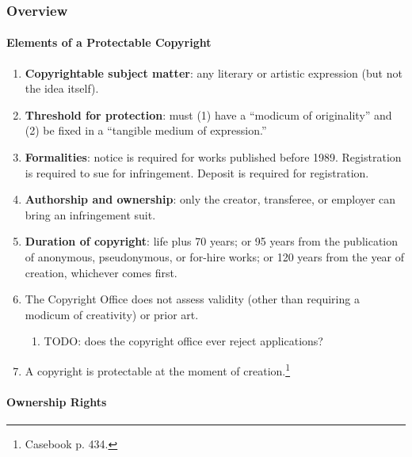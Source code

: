 \subsubsection{Overview}

\paragraph{Elements of a Protectable Copyright}

\begin{enumerate}
    \item \textbf{Copyrightable subject matter}: any literary or artistic 
    expression (but not the idea itself).
    \item \textbf{Threshold for protection}: must (1) have a ``modicum of 
    originality'' and (2) be fixed in a ``tangible medium of expression.''
    \item \textbf{Formalities}: notice is required for works published before 
    1989. Registration is required to sue for infringement. Deposit is 
    required for registration.
    \item \textbf{Authorship and ownership}: only the creator, transferee, or 
    employer can bring an infringement suit.
    \item \textbf{Duration of copyright}: life plus 70 years; or 95 years from 
    the publication of anonymous, pseudonymous, or for-hire works; or 120 
    years from the year of creation, whichever comes first.
    \item The Copyright Office does not assess validity (other than requiring 
    a modicum of creativity) or prior art.
    \begin{enumerate}
        \item TODO: does the copyright office ever reject applications?
    \end{enumerate}
    \item A copyright is protectable at the moment of 
    creation.\footnote{Casebook p. 434.}
\end{enumerate}

\paragraph{Ownership Rights}

